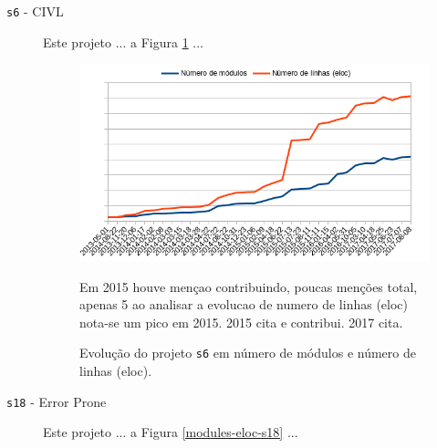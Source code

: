 \begin{description}

  \item[\texttt{s6} - CIVL]
    Este projeto ... a Figura \ref{modules-eloc-s6} ...


\begin{figure}[h]
  \centering
  \begin{minipage}{0.6\textwidth}
    \includegraphics[scale=0.6]{imagens/modules-eloc-s6.png}
  \end{minipage}
  \begin{minipage}{0.25\textwidth}
  {\small Em 2015 houve mençao contribuindo, poucas menções total, apenas 5 ao analisar a
evolucao de numero de linhas (eloc) nota-se um pico em 2015.  2015	cita e
contribui.  2017	cita.}
  \end{minipage}
  \caption{Evolução do projeto \texttt{s6} em número de módulos e número de linhas (eloc).}
  \label{modules-eloc-s6}
\end{figure}

  \item[\texttt{s18} - Error Prone]
    Este projeto ... a Figura \ref{modules-eloc-s18} ...



\end{description}
